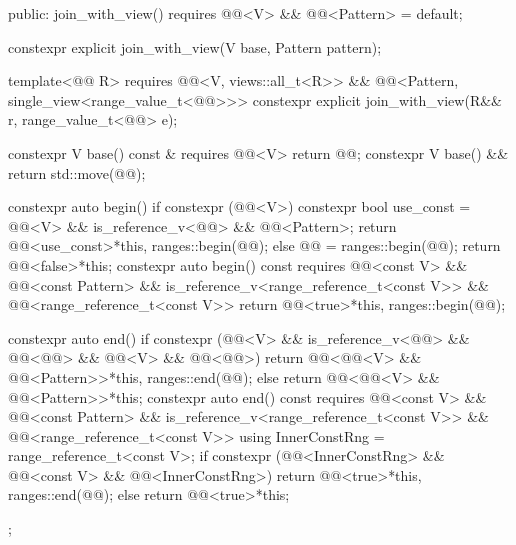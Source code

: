 \begin{codeblock}
{{  public:
    join_with_view()
      requires @@<V> && @@<Pattern> = default;

    constexpr explicit join_with_view(V base, Pattern pattern);

    template<@@ R>
      requires @@<V, views::all_t<R>> &&
               @@<Pattern, single_view<range_value_t<@@>>>
    constexpr explicit join_with_view(R&& r, range_value_t<@@> e);

    constexpr V base() const & requires @@<V> { return @@; }
    constexpr V base() && { return std::move(@@); }

    constexpr auto begin() {
      if constexpr (@@<V>) {
        constexpr bool use_const =
          @@<V> && is_reference_v<@@> && @@<Pattern>;
        return @@<use_const>{*this, ranges::begin(@@)};
      }
      else {
        @@ = ranges::begin(@@);
        return @@<false>{*this};
      }
    }
    constexpr auto begin() const
      requires @@<const V> &&
               @@<const Pattern> &&
               is_reference_v<range_reference_t<const V>> &&
               @@<range_reference_t<const V>> {
      return @@<true>{*this, ranges::begin(@@)};
    }

    constexpr auto end() {
      if constexpr (@@<V> &&
                    is_reference_v<@@> && @@<@@> &&
                    @@<V> && @@<@@>)
        return @@<@@<V> && @@<Pattern>>{*this, ranges::end(@@)};
      else
        return @@<@@<V> && @@<Pattern>>{*this};
    }
    constexpr auto end() const
      requires @@<const V> && @@<const Pattern> &&
               is_reference_v<range_reference_t<const V>> &&
               @@<range_reference_t<const V>> {
      using InnerConstRng = range_reference_t<const V>;
      if constexpr (@@<InnerConstRng> &&
                    @@<const V> && @@<InnerConstRng>)
        return @@<true>{*this, ranges::end(@@)};
      else
        return @@<true>{*this};
    }
  };

}
\end{codeblock}
